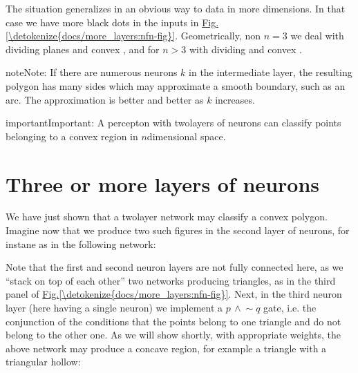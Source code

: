 \documentclass[letterpaper,10pt,english]{jupyterBook}
\begin{document}
\sphinxAtStartPar
The situation generalizes in an obvious way to data in more dimensions. In that case we have more black dots in the inputs in  \hyperref[\detokenize{docs/more_layers:nfn-fig}]{Fig.\@ \ref{\detokenize{docs/more_layers:nfn-fig}}}. Geometrically, non \(n=3\) we deal with dividing planes and convex , and for \(n>3\) with dividing  and convex .

\begin{sphinxadmonition}{note}{Note:}
\sphinxAtStartPar
If there are numerous neurons \(k\) in the intermediate layer, the resulting polygon has many sides which may approximate a smooth boundary, such as an arc. The approximation is better and better as \(k\) increases.
\end{sphinxadmonition}

\begin{sphinxadmonition}{important}{Important:}
\sphinxAtStartPar
A percepton with two\sphinxhyphen{}layers of neurons can classify points belonging to a convex region in \(n\)\sphinxhyphen{}dimensional space.
\end{sphinxadmonition}


\section{Three or more layers of neurons}
\label{\detokenize{docs/more_layers:three-or-more-layers-of-neurons}}
\sphinxAtStartPar
We have just shown that a two\sphinxhyphen{}layer network may classify a convex polygon. Imagine now that we produce two such figures in the second layer of neurons, for instane as in the following network:

\noindent{}

\sphinxAtStartPar
Note that the first and second neuron layers are not fully connected here, as we “stack on top of each other” two networks producing triangles, as in the third panel of \hyperref[\detokenize{docs/more_layers:nfn-fig}]{Fig.\@ \ref{\detokenize{docs/more_layers:nfn-fig}}}. Next, in the third neuron layer (here having a single neuron) we implement a \(p \,\wedge \!\sim\!q\) gate, i.e. the conjunction of the conditions that the points belong to one triangle and do not belong to the other one. As we will show shortly, with appropriate weights, the above network may produce a concave region, for example a triangle with a triangular hollow:
\end{document}
